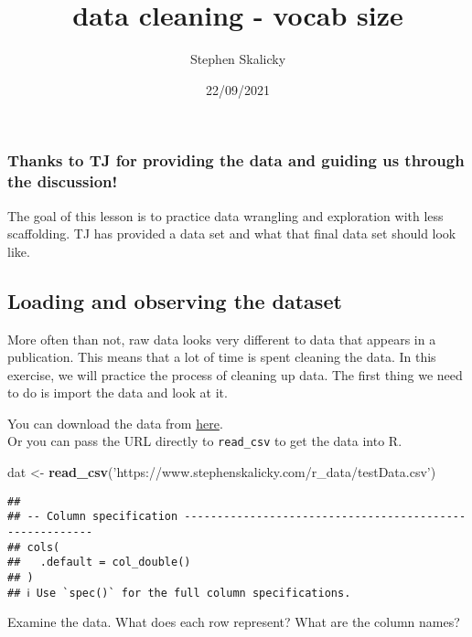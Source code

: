 \documentclass[
]{article}
\title{data cleaning - vocab size}
\author{Stephen Skalicky}
\date{22/09/2021}
\newenvironment{Shaded}{\begin{snugshade}}{\end{snugshade}}
\newcommand{\KeywordTok}[1]{\textcolor[rgb]{0.13,0.29,0.53}{\textbf{#1}}}
\newcommand{\NormalTok}[1]{#1}
\newcommand{\StringTok}[1]{\textcolor[rgb]{0.31,0.60,0.02}{#1}}
\begin{document}
\maketitle

\hypertarget{thanks-to-tj-for-providing-the-data-and-guiding-us-through-the-discussion}{%
\subsubsection{Thanks to TJ for providing the data and guiding us
through the
discussion!}\label{thanks-to-tj-for-providing-the-data-and-guiding-us-through-the-discussion}}

The goal of this lesson is to practice data wrangling and exploration
with less scaffolding. TJ has provided a data set and what that final
data set should look like.

\hypertarget{loading-and-observing-the-dataset}{%
\subsection{Loading and observing the
dataset}\label{loading-and-observing-the-dataset}}

More often than not, raw data looks very different to data that appears
in a publication. This means that a lot of time is spent cleaning the
data. In this exercise, we will practice the process of cleaning up
data. The first thing we need to do is import the data and look at it.

You can download the data from
\href{https://www.stephenskalicky.com/r_data/testData.csv}{here}.\\

Or you can pass the URL directly to \texttt{read\_csv} to get the data
into R.

\begin{Shaded}
\begin{Highlighting}[]
\NormalTok{dat <-}\StringTok{ }\KeywordTok{read_csv}\NormalTok{(}\StringTok{'https://www.stephenskalicky.com/r_data/testData.csv'}\NormalTok{)}
\end{Highlighting}
\end{Shaded}

\begin{verbatim}
## 
## -- Column specification --------------------------------------------------------
## cols(
##   .default = col_double()
## )
## ℹ Use `spec()` for the full column specifications.
\end{verbatim}

Examine the data. What does each row represent? What are the column
names?
\end{document}
